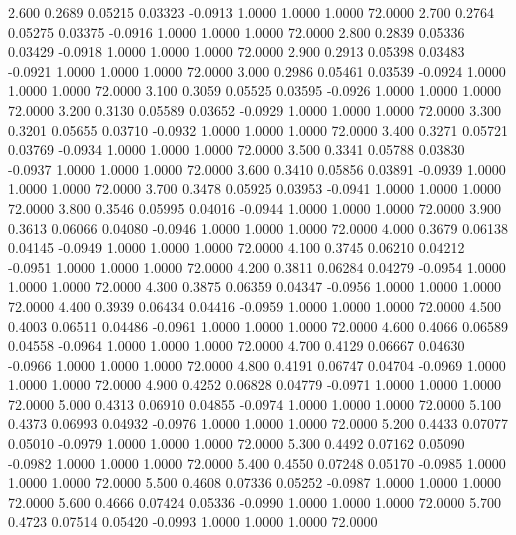    2.600   0.2689   0.05215   0.03323  -0.0913   1.0000   1.0000   1.0000  72.0000
   2.700   0.2764   0.05275   0.03375  -0.0916   1.0000   1.0000   1.0000  72.0000
   2.800   0.2839   0.05336   0.03429  -0.0918   1.0000   1.0000   1.0000  72.0000
   2.900   0.2913   0.05398   0.03483  -0.0921   1.0000   1.0000   1.0000  72.0000
   3.000   0.2986   0.05461   0.03539  -0.0924   1.0000   1.0000   1.0000  72.0000
   3.100   0.3059   0.05525   0.03595  -0.0926   1.0000   1.0000   1.0000  72.0000
   3.200   0.3130   0.05589   0.03652  -0.0929   1.0000   1.0000   1.0000  72.0000
   3.300   0.3201   0.05655   0.03710  -0.0932   1.0000   1.0000   1.0000  72.0000
   3.400   0.3271   0.05721   0.03769  -0.0934   1.0000   1.0000   1.0000  72.0000
   3.500   0.3341   0.05788   0.03830  -0.0937   1.0000   1.0000   1.0000  72.0000
   3.600   0.3410   0.05856   0.03891  -0.0939   1.0000   1.0000   1.0000  72.0000
   3.700   0.3478   0.05925   0.03953  -0.0941   1.0000   1.0000   1.0000  72.0000
   3.800   0.3546   0.05995   0.04016  -0.0944   1.0000   1.0000   1.0000  72.0000
   3.900   0.3613   0.06066   0.04080  -0.0946   1.0000   1.0000   1.0000  72.0000
   4.000   0.3679   0.06138   0.04145  -0.0949   1.0000   1.0000   1.0000  72.0000
   4.100   0.3745   0.06210   0.04212  -0.0951   1.0000   1.0000   1.0000  72.0000
   4.200   0.3811   0.06284   0.04279  -0.0954   1.0000   1.0000   1.0000  72.0000
   4.300   0.3875   0.06359   0.04347  -0.0956   1.0000   1.0000   1.0000  72.0000
   4.400   0.3939   0.06434   0.04416  -0.0959   1.0000   1.0000   1.0000  72.0000
   4.500   0.4003   0.06511   0.04486  -0.0961   1.0000   1.0000   1.0000  72.0000
   4.600   0.4066   0.06589   0.04558  -0.0964   1.0000   1.0000   1.0000  72.0000
   4.700   0.4129   0.06667   0.04630  -0.0966   1.0000   1.0000   1.0000  72.0000
   4.800   0.4191   0.06747   0.04704  -0.0969   1.0000   1.0000   1.0000  72.0000
   4.900   0.4252   0.06828   0.04779  -0.0971   1.0000   1.0000   1.0000  72.0000
   5.000   0.4313   0.06910   0.04855  -0.0974   1.0000   1.0000   1.0000  72.0000
   5.100   0.4373   0.06993   0.04932  -0.0976   1.0000   1.0000   1.0000  72.0000
   5.200   0.4433   0.07077   0.05010  -0.0979   1.0000   1.0000   1.0000  72.0000
   5.300   0.4492   0.07162   0.05090  -0.0982   1.0000   1.0000   1.0000  72.0000
   5.400   0.4550   0.07248   0.05170  -0.0985   1.0000   1.0000   1.0000  72.0000
   5.500   0.4608   0.07336   0.05252  -0.0987   1.0000   1.0000   1.0000  72.0000
   5.600   0.4666   0.07424   0.05336  -0.0990   1.0000   1.0000   1.0000  72.0000
   5.700   0.4723   0.07514   0.05420  -0.0993   1.0000   1.0000   1.0000  72.0000
